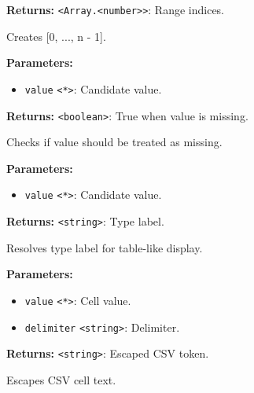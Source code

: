 \documentclass[12pt,a4paper]{article}
\begin{document}
\noindent \textbf{Returns:} \texttt{<Array.<number>>}: Range indices.

\noindent Creates [0, ..., n - 1].

\vspace{5mm}
\noindent {}


\noindent \textbf{Parameters:}
\begin{itemize}
  \item \texttt{value} \texttt{<*>}: Candidate value.
\end{itemize}

\noindent \textbf{Returns:} \texttt{<boolean>}: True when value is missing.

\noindent Checks if value should be treated as missing.

\vspace{5mm}
\noindent {}


\noindent \textbf{Parameters:}
\begin{itemize}
  \item \texttt{value} \texttt{<*>}: Candidate value.
\end{itemize}

\noindent \textbf{Returns:} \texttt{<string>}: Type label.

\noindent Resolves type label for table-like display.

\vspace{5mm}
\noindent {}


\noindent \textbf{Parameters:}
\begin{itemize}
  \item \texttt{value} \texttt{<*>}: Cell value.
  \item \texttt{delimiter} \texttt{<string>}: Delimiter.
\end{itemize}

\noindent \textbf{Returns:} \texttt{<string>}: Escaped CSV token.

\noindent Escapes CSV cell text.

\vspace{5mm}
\noindent {}
\end{document}
